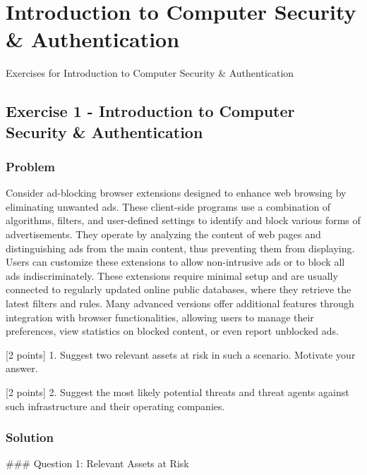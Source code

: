 \documentclass{article}
\begin{document}
\section{Introduction to Computer Security \& Authentication}
Exercises for Introduction to Computer Security \& Authentication

\subsection{Exercise 1 - Introduction to Computer Security \& Authentication}
\subsubsection*{Problem}
Consider ad-blocking browser extensions designed to enhance web browsing by eliminating unwanted ads. These client-side programs use a combination of algorithms, filters, and user-defined settings to identify and block various forms of advertisements. They operate by analyzing the content of web pages and distinguishing ads from the main content, thus preventing them from displaying. Users can customize these extensions to allow non-intrusive ads or to block all ads indiscriminately. These extensions require minimal setup and are usually connected to regularly updated online public databases, where they retrieve the latest filters and rules. Many advanced versions offer additional features through integration with browser functionalities, allowing users to manage their preferences, view statistics on blocked content, or even report unblocked ads.

[2 points] 1. Suggest two relevant assets at risk in such a scenario. Motivate your answer.

[2 points] 2. Suggest the most likely potential threats and threat agents against such infrastructure and their operating companies.

\subsubsection*{Solution}
\#\#\# Question 1: Relevant Assets at Risk
\end{document}
